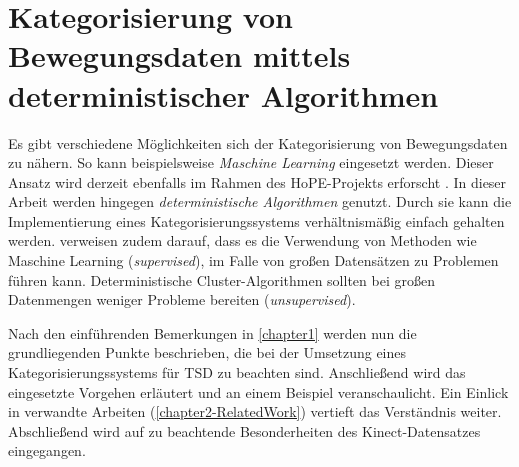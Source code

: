 \chapter{Kategorisierung von Bewegungsdaten mittels deterministischer Algorithmen}
\label{chapter2}
Es gibt verschiedene Möglichkeiten sich der Kategorisierung von Bewegungsdaten zu nähern.
So kann beispielsweise \emph{Maschine Learning} eingesetzt werden.
Dieser Ansatz wird derzeit ebenfalls im Rahmen des HoPE-Projekts erforscht \citep{plischke_master_2022}.
In dieser Arbeit werden hingegen \emph{deterministische Algorithmen} genutzt.
Durch sie kann die Implementierung eines Kategorisierungssystems verhältnismäßig einfach gehalten werden.
\citet{aghabozorgi_time-series_2015} verweisen zudem darauf, dass es die Verwendung von Methoden
wie Maschine Learning (\emph{supervised}), im Falle von großen Datensätzen zu Problemen führen kann.
Deterministische Cluster-Algorithmen sollten bei großen Datenmengen weniger Probleme bereiten (\emph{unsupervised}).

Nach den einführenden Bemerkungen in \autoref{chapter1} werden nun die grundliegenden Punkte beschrieben,
die bei der Umsetzung eines Kategorisierungssystems für \ac{TSD} zu beachten sind.
Anschließend wird das eingesetzte Vorgehen erläutert und an einem Beispiel veranschaulicht.
Ein Einlick in verwandte Arbeiten (\autoref{chapter2-RelatedWork}) vertieft das Verständnis weiter.
Abschließend wird auf zu beachtende Besonderheiten des Kinect-Datensatzes eingegangen.


